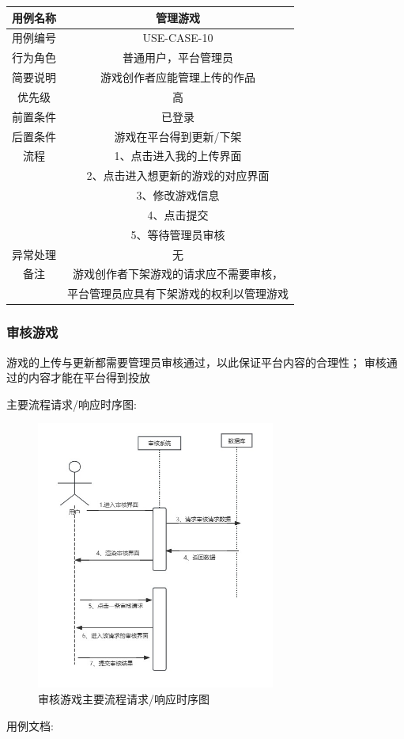 \documentclass[12pt]{ctexart} %
\begin{document}
\begin{tabular}{|c|c|}
  \hline
  用例名称& 管理游戏\\
  \hline
  用例编号 & USE-CASE-10\\
  \hline
  行为角色 & 普通用户，平台管理员\\
  \hline
  简要说明 & 游戏创作者应能管理上传的作品\\
  \hline
  优先级 & 高\\
  \hline
  前置条件 & 已登录\\
  \hline
  后置条件 & 游戏在平台得到更新/下架\\
  \hline
  流程 & 1、点击进入我的上传界面\\
      &  2、点击进入想更新的游戏的对应界面\\
      &  3、修改游戏信息\\
      &  4、点击提交\\
      &  5、等待管理员审核\\
  \hline
  异常处理 & 无\\
  \hline
  备注 & 游戏创作者下架游戏的请求应不需要审核，\\
       & 平台管理员应具有下架游戏的权利以管理游戏\\
  \hline
\end{tabular}

\subsubsection{审核游戏}
游戏的上传与更新都需要管理员审核通过，以此保证平台内容的合理性；
审核通过的内容才能在平台得到投放

主要流程请求/响应时序图:
\begin{figure}[ht]
  \centering
  \includegraphics[width=0.7\textwidth]{yongli11.jpg}
  \caption{审核游戏主要流程请求/响应时序图}
\end{figure}
用例文档:
\end{document}

